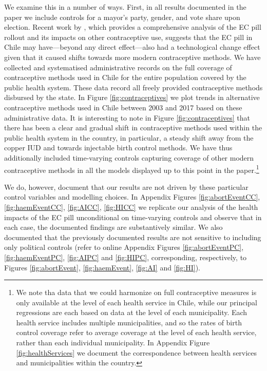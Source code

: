 \documentclass[12pt]{article}
\begin{document}
\begin{spacing}{1.9}
  We examine this in a number of ways.  First, in all results documented in the paper we include controls for a mayor's party, gender, and vote share upon election.   Recent work by \citet{NuevoChiqueroPino2019}, which provides a comprehensive analysis of the EC pill rollout and its impacts on other contraceptive use, suggests that the EC pill in Chile may have---beyond any direct effect---also had a technological change effect given that it caused shifts towards more modern contraceptive methods.  We have collected and systematised administrative records on the full coverage of contraceptive methods used in Chile for the entire population covered by the public health system.  These data record all freely provided contraceptive methods disbursed by the state.  In Figure \ref{fig:contraceptives} we plot trends in alternative contraceptive methods used in Chile between 2003 and 2017 based on these administrative data. 
  It is interesting to note in Figure \ref{fig:contraceptives} that there has been a clear and gradual shift in contraceptive methods used within the public health system in the country, in particular, a steady shift away from the copper IUD and towards injectable birth control methods.  We have thus additionally included time-varying controls capturing coverage of other modern contraceptive methods in all the models displayed up to this point in the paper.\footnote{We note tha data that we could harmonize on full contraceptive measures is only available at the level of each health service in Chile, while our principal regressions are each based on data at the level of each municipality.  Each health service includes multiple municipalities, and so the rates of birth control coverage refer to average coverage at the level of each health service, rather than each individual municipality.
    In Appendix Figure \ref{fig:healthServices} we document the correspondence between health services and municipalities within the country.}  


  We do, however, document that our results are not driven by these particular control variables and modelling choices.  In Appendix Figures \ref{fig:abortEventCC}, \ref{fig:haemEventCC}, \ref{fig:AICC}, \ref{fig:HICC} we replicate our analysis of the health impacts of the EC pill unconditional on time-varying controls and observe that in each case, the documented findings are substantively similar.  We also documented that the previously documented results are not sensitive to including only political controls (refer to online Appendix Figures \ref{fig:abortEventPC}, \ref{fig:haemEventPC}, \ref{fig:AIPC} and \ref{fig:HIPC}, corresponding, respectively, to Figures \ref{fig:abortEvent}, \ref{fig:haemEvent}, \ref{fig:AI} and \ref{fig:HI}).


\end{spacing}
\end{document}
